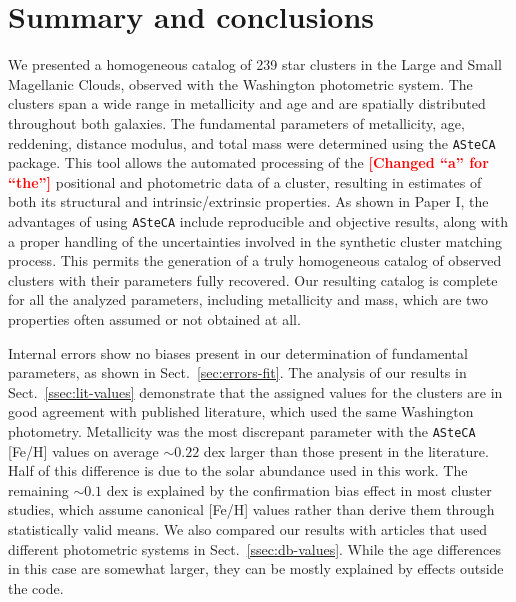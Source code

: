 \documentclass[draft]{aa}
\newcommand{\LEt}[1]{\textcolor{red}{\textbf{[#1]}}}
\begin{document}

\section{Summary and conclusions}
\label{sec:summ-concl}

We presented a homogeneous catalog of 239 star clusters in the Large and Small
Magellanic Clouds, observed with the Washington photometric system. The clusters
span a wide range in metallicity and age and are spatially distributed
throughout both galaxies.
%
The fundamental parameters of metallicity, age, reddening, distance modulus, and
total mass were determined using the \texttt{ASteCA} package.
%
This tool allows the automated processing of the \LEt{Changed ``a'' for ``the''}
positional and photometric data of a cluster, resulting in estimates of both its
structural and intrinsic/extrinsic properties.
%
As shown in Paper I, the advantages of using \texttt{ASteCA} include
reproducible and objective results, along with a proper handling of the
uncertainties involved in the synthetic cluster matching process.
%
This permits the generation of a truly homogeneous catalog of observed
clusters with their parameters fully recovered.
%
Our resulting catalog is complete for all the analyzed parameters, including
metallicity and mass, which are two properties often assumed or not obtained at all.

Internal errors show no biases present in our determination of fundamental
parameters, as shown in Sect.~\ref{sec:errors-fit}.
%
The analysis of our results in Sect.~\ref{ssec:lit-values} demonstrate that the
assigned values for the clusters are in good agreement with published literature,
which used the same Washington photometry.
%
Metallicity was the most discrepant parameter with the \texttt{ASteCA}
[Fe/H] values on average ${\sim}0.22$ dex larger than those present in the
literature. Half of this difference is due to the solar abundance used in
this work. The remaining ${\sim}0.1$ dex is explained by the confirmation
bias effect in most cluster studies, which assume canonical [Fe/H]
values rather than derive them through statistically valid means.
%
We also compared our results with articles that used different photometric
systems in Sect.~\ref{ssec:db-values}. While the age differences in
this case are somewhat larger, they can be mostly explained by effects outside
the code.
\end{document}
